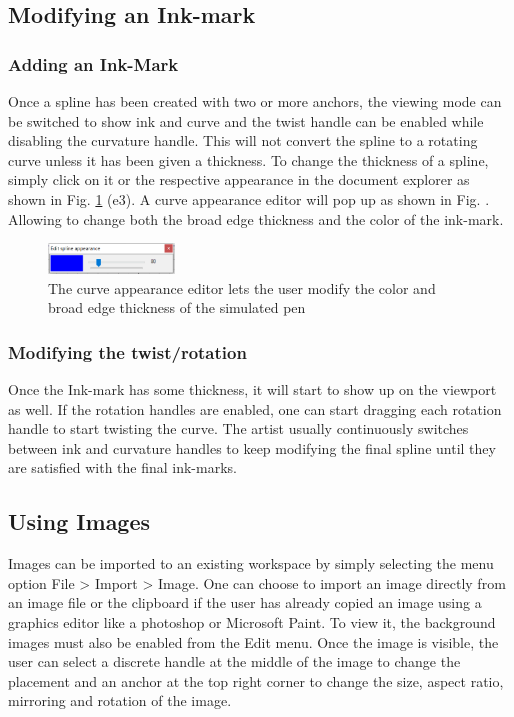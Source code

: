 \subsection{Modifying an Ink-mark}
{
    \subsubsection{Adding an Ink-Mark}
    {
        Once a spline has been created with two or more anchors, the viewing mode can be switched to show ink and curve and the twist handle can be enabled while disabling the curvature handle. This will not convert the spline to a rotating curve unless it has been given a thickness. To change the thickness of a spline, simply click on it or the respective appearance in the document explorer as shown in Fig. \ref{Fig:AppearanceEditor} (e3). A curve appearance editor will pop up as shown in Fig. . Allowing to change both the broad edge thickness and the color of the ink-mark.

        \begin{figure}
          \centering
          \includegraphics[width=0.3\textwidth]{appearance editor.PNG}
          \caption{The curve appearance editor lets the user modify the color and broad edge thickness of the simulated pen} \label{Fig:AppearanceEditor}
        \end{figure}
    }
    \subsubsection{Modifying the twist/rotation}
    {
        Once the Ink-mark has some thickness, it will start to show up on the viewport as well. If the rotation handles are enabled, one can start dragging each rotation handle to start twisting the curve. The artist usually continuously switches between ink and curvature handles to keep modifying the final spline until they are satisfied with the final ink-marks.
    }
}
\subsection{Using Images}
{
    Images can be imported to an existing workspace by simply selecting the menu option File > Import > Image. One can choose to import an image directly from an image file or the clipboard if the user has already copied an image using a graphics editor like a photoshop or Microsoft Paint. To view it, the background images must also be enabled from the Edit menu. Once the image is visible, the user can select a discrete handle at the middle of the image to change the placement and an anchor at the top right corner to change the size, aspect ratio, mirroring and rotation of the image.
}
